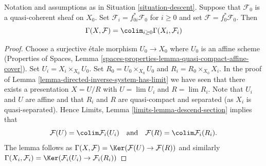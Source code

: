 \begin{lemma}
\label{lemma-descend-section}
Notation and assumptions as in Situation \ref{situation-descent}.
Suppose that $\mathcal{F}_0$ is a quasi-coherent sheaf on $X_0$.
Set $\mathcal{F}_i = f_{0i}^*\mathcal{F}_0$ for $i \geq 0$ and set
$\mathcal{F} = f_0^*\mathcal{F}_0$. Then
$$
\Gamma(X, \mathcal{F}) = \colim_{i \geq 0} \Gamma(X_i, \mathcal{F}_i)
$$
\end{lemma}

\begin{proof}
Choose a surjective \'etale morphism $U_0 \to X_0$ where $U_0$ is an affine
scheme (Properties of Spaces, Lemma
\ref{spaces-properties-lemma-quasi-compact-affine-cover}).
Set $U_i = X_i \times_{X_0} U_0$.
Set $R_0 = U_0 \times_{X_0} U_0$ and $R_i = R_0 \times_{X_0} X_i$.
In the proof of Lemma \ref{lemma-directed-inverse-system-has-limit} we have
seen that there exists a presentation $X = U/R$ with
$U = \lim U_i$ and $R = \lim R_i$.
Note that $U_i$ and $U$ are affine and that $R_i$ and $R$ are
quasi-compact and separated (as $X_i$ is quasi-separated). Hence
Limits, Lemma \ref{limits-lemma-descend-section}
implies that
$$
\mathcal{F}(U) = \colim \mathcal{F}_i(U_i)
\quad\text{and}\quad
\mathcal{F}(R) = \colim \mathcal{F}_i(R_i).
$$
The lemma follows as
$\Gamma(X, \mathcal{F}) = \Ker(\mathcal{F}(U) \to \mathcal{F}(R))$
and similarly
$\Gamma(X_i, \mathcal{F}_i) =
\Ker(\mathcal{F}_i(U_i) \to \mathcal{F}_i(R_i))$
\end{proof}
